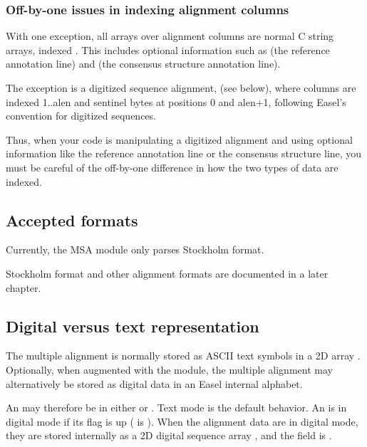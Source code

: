 \subsubsection{Off-by-one issues in indexing alignment columns}

With one exception, all arrays over alignment columns are normal C
string arrays, indexed . This includes optional
information such as  (the reference annotation line)
and  (the consensus structure annotation line).

The exception is a digitized sequence alignment, 
(see below), where columns are indexed 1..alen and sentinel bytes at
positions 0 and alen+1, following Easel's convention for digitized
sequences.

Thus, when your code is manipulating a digitized alignment and using
optional information like the reference annotation line or the
consensus structure line, you must be careful of the off-by-one
difference in how the two types of data are indexed.

\subsection{Accepted formats}

Currently, the MSA module only parses Stockholm format. 

Stockholm format and other alignment formats are documented in a later
chapter.

\subsection{Digital versus text representation}

The multiple alignment is normally stored as ASCII text symbols in a
2D array . Optionally, when
augmented with the  module, the multiple alignment
may alternatively be stored as digital data in an Easel internal
alphabet.

An  may therefore be in either  or
. Text mode is the default behavior. An
 is in digital mode if its  flag
is up ( is ). When the
alignment data are in digital mode, they are stored internally as a 2D
digital sequence array , and
the  field is .

